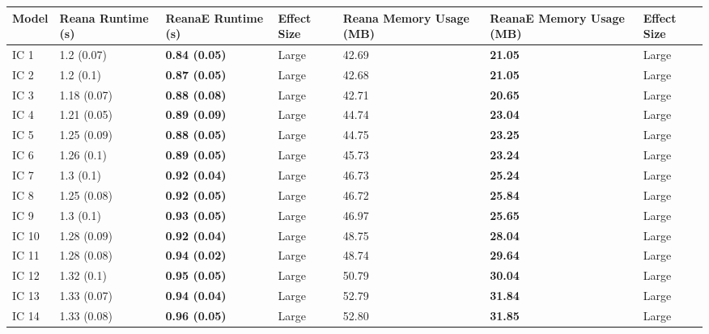 \begin{tabular}{lllllll}
\toprule
 Model & Reana Runtime (s) &    ReanaE Runtime (s) & Effect Size & Reana Memory Usage (MB) & ReanaE Memory Usage (MB) & Effect Size \\
\midrule
  IC 1 &        1.2 (0.07) &  \textbf{0.84 (0.05)} &       Large &                   42.69 &           \textbf{21.05} &       Large \\
  IC 2 &         1.2 (0.1) &  \textbf{0.87 (0.05)} &       Large &                   42.68 &           \textbf{21.05} &       Large \\
  IC 3 &       1.18 (0.07) &  \textbf{0.88 (0.08)} &       Large &                   42.71 &           \textbf{20.65} &       Large \\
  IC 4 &       1.21 (0.05) &  \textbf{0.89 (0.09)} &       Large &                   44.74 &           \textbf{23.04} &       Large \\
  IC 5 &       1.25 (0.09) &  \textbf{0.88 (0.05)} &       Large &                   44.75 &           \textbf{23.25} &       Large \\
  IC 6 &        1.26 (0.1) &  \textbf{0.89 (0.05)} &       Large &                   45.73 &           \textbf{23.24} &       Large \\
  IC 7 &         1.3 (0.1) &  \textbf{0.92 (0.04)} &       Large &                   46.73 &           \textbf{25.24} &       Large \\
  IC 8 &       1.25 (0.08) &  \textbf{0.92 (0.05)} &       Large &                   46.72 &           \textbf{25.84} &       Large \\
  IC 9 &         1.3 (0.1) &  \textbf{0.93 (0.05)} &       Large &                   46.97 &           \textbf{25.65} &       Large \\
 IC 10 &       1.28 (0.09) &  \textbf{0.92 (0.04)} &       Large &                   48.75 &           \textbf{28.04} &       Large \\
 IC 11 &       1.28 (0.08) &  \textbf{0.94 (0.02)} &       Large &                   48.74 &           \textbf{29.64} &       Large \\
 IC 12 &        1.32 (0.1) &  \textbf{0.95 (0.05)} &       Large &                   50.79 &           \textbf{30.04} &       Large \\
 IC 13 &       1.33 (0.07) &  \textbf{0.94 (0.04)} &       Large &                   52.79 &           \textbf{31.84} &       Large \\
 IC 14 &       1.33 (0.08) &  \textbf{0.96 (0.05)} &       Large &                   52.80 &           \textbf{31.85} &       Large \\

\end{tabular}
